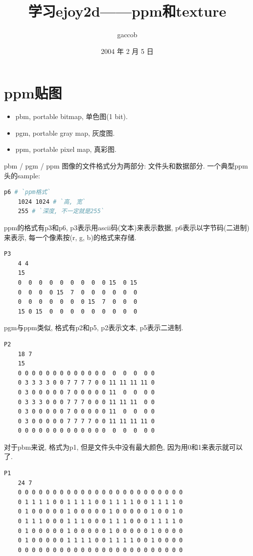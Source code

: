 

\title {\ZHH \huge 学习ejoy2d——ppm和texture}
\author {\small gaccob}
\date {\small 2004 年 2 月 5 日}
\maketitle

\section* {\ZHH \Large ppm贴图} {
    \begin {itemize}
    \item {pbm, portable bitmap, 单色图(1 bit). }
    \item {pgm, portable gray map, 灰度图. }
    \item {ppm, portable pixel map, 真彩图. }
    \end {itemize}\par

    {pbm / pgm / ppm 图像的文件格式分为两部分: 文件头和数据部分. 一个典型ppm头的sample: }\par
    \begin{lstlisting}[language=bash]
    p6 # `ppm格式`
    1024 1024 # `高, 宽`
    255 # `深度, 不一定就是255`
    \end{lstlisting}

    {ppm的格式有p3和p6, p3表示用ascii码(文本)来表示数据, p6表示以字节码(二进制)来表示, 每一个像素按(r, g, b)的格式来存储. }\par
    \begin{lstlisting}[language=bash]
    P3
    4 4
    15
    0  0  0  0  0  0  0  0  0 15  0 15
    0  0  0  0 15  7  0  0  0  0  0  0
    0  0  0  0  0  0  0 15  7  0  0  0
    15 0 15  0  0  0  0  0  0  0  0  0
    \end{lstlisting}

    {pgm与ppm类似, 格式有p2和p5, p2表示文本, p5表示二进制.}\par
    \begin{lstlisting}[language=bash]
    P2
    18 7
    15
    0 0 0 0 0 0 0 0 0 0 0 0 0  0  0  0  0 0
    0 3 3 3 3 0 0 7 7 7 7 0 0 11 11 11 11 0
    0 3 0 0 0 0 0 7 0 0 0 0 0 11  0  0  0 0
    0 3 3 3 0 0 0 7 7 7 0 0 0 11 11 11  0 0
    0 3 0 0 0 0 0 7 0 0 0 0 0 11  0  0  0 0
    0 3 0 0 0 0 0 7 7 7 7 0 0 11 11 11 11 0
    0 0 0 0 0 0 0 0 0 0 0 0 0  0  0  0  0 0
    \end{lstlisting}

    {对于pbm来说, 格式为p1, 但是文件头中没有最大颜色, 因为用0和1来表示就可以了.}\par
    \begin{lstlisting}[language=bash]
    P1
    24 7
    0 0 0 0 0 0 0 0 0 0 0 0 0 0 0 0 0 0 0 0 0 0 0 0
    0 1 1 1 1 0 0 1 1 1 1 0 0 1 1 1 1 0 0 1 1 1 1 0
    0 1 0 0 0 0 0 1 0 0 0 0 0 1 0 0 0 0 0 1 0 0 1 0
    0 1 1 1 0 0 0 1 1 1 0 0 0 1 1 1 0 0 0 1 1 1 1 0
    0 1 0 0 0 0 0 1 0 0 0 0 0 1 0 0 0 0 0 1 0 0 0 0
    0 1 0 0 0 0 0 1 1 1 1 0 0 1 1 1 1 0 0 1 0 0 0 0
    0 0 0 0 0 0 0 0 0 0 0 0 0 0 0 0 0 0 0 0 0 0 0 0
    \end{lstlisting}

}
